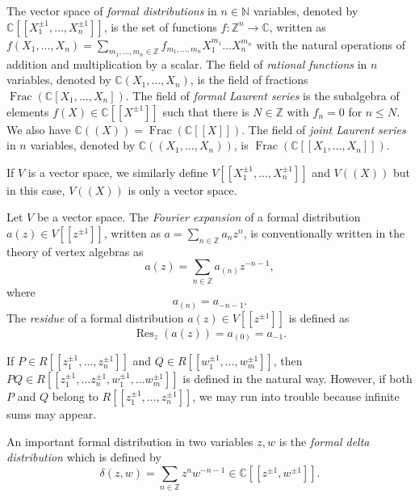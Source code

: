 \documentclass[a4paper, 12pt, reqno]{amsart}
\theoremstyle{remark}
\numberwithin{equation}{subsection}
\DeclareMathOperator{\Frac}{Frac}
\DeclareMathOperator{\Res}{Res}
\begin{document}
The vector space of \emph{formal distributions} in $n \in \mathbb{N}$ variables, denoted by $\mathbb{C}[[X_1^{\pm 1}, \dots, X_n^{\pm 1}]]$, is the set of functions $f: \mathbb{Z}^n \to \mathbb{C}$, written as $f(X_1, \dots, X_n) = \sum_{m_1, \dots, m_n \in \mathbb{Z}}f_{m_1, \dots, m_n}X_1^{m_1}\dots X_n^{m_n} $ with the natural operations of addition and multiplication by a scalar.
The field of \emph{rational functions} in $n$ variables, denoted by $\mathbb{C}(X_1, \dots, X_n)$, is the field of fractions $\Frac(\mathbb{C}[X_1, \dots, X_n])$.
The field of \emph{formal Laurent series} is the subalgebra of elements $f(X) \in \mathbb{C}[[X^{\pm 1}]]$ such that there is $N \in \mathbb{Z}$ with $f_n = 0$ for $n \le N$.
We also have $\mathbb{C}((X)) = \Frac(\mathbb{C}[[X]])$.
The field of \emph{joint Laurent series} in $n$ variables, denoted by $\mathbb{C}((X_1, \dots, X_n))$, is $\Frac(\mathbb{C}[[X_1, \dots, X_n]])$.

If $V$ is a vector space, we similarly define $V[[X_1^{\pm 1}, \dots, X_n^{\pm 1}]]$ and $V((X))$ but in this case, $V((X))$ is only a vector space.

Let $V$ be a vector space.
The \emph{Fourier expansion} of a formal distribution $a(z) \in V[[z^{\pm 1}]]$, written as $a = \sum_{n \in \mathbb{Z}} a_nz^n$, is conventionally written in the theory of vertex algebras as
\begin{equation*}
  a(z) = \sum_{n \in \mathbb{Z}}a_{(n)}z^{-n - 1},
\end{equation*}
where
\begin{equation*}
  a_{(n)} = a_{-n-1}.
\end{equation*}
The \emph{residue} of a formal distribution $a(z) \in V[[z^{\pm 1}]]$ is defined as
\begin{equation*}
  \Res_z(a(z)) = a_{(0)} = a_{-1}.
\end{equation*}

If $P\in R[[z_1^{\pm 1},\dots, z_n^{\pm 1}]]$ and $Q\in R[[w_1^{\pm 1},\dots, w_m^{\pm 1}]]$, then $PQ\in R[[z_1^{\pm 1},\dots z_n^{\pm 1},w_1^{\pm 1},\dots w_m^{\pm 1}]]$ is defined in the natural way.
However, if both $P$ and $Q$ belong to $R[[z_1^{\pm 1},\dots, z_n^{\pm 1}]]$, we may run into trouble because infinite sums may appear.

An important formal distribution in two variables $z, w$ is the \emph{formal delta distribution} which is defined by
\begin{equation*}
  \delta(z, w) = \sum_{n \in \mathbb{Z}}z^nw^{-n - 1} \in \mathbb{C}[[z^{\pm 1}, w^{\pm 1}]].
\end{equation*}
\end{document}
